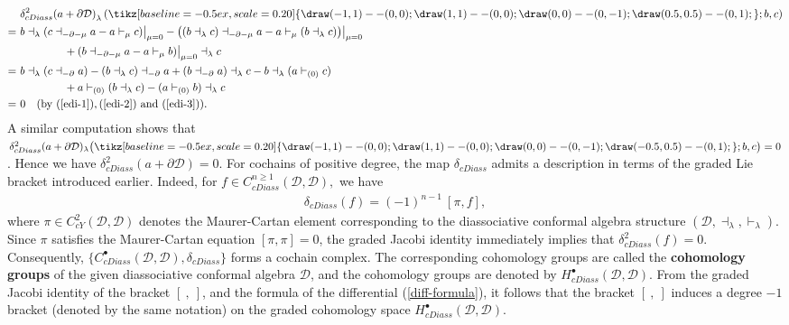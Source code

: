 \documentclass[a4paper,reqno,10pt]{amsart}
\theoremstyle{plain}
\theoremstyle{definition}
\theoremstyle{remark}
\newcommand{\D}{\mathcal{D}}
\newcommand{\p}{\partial}
\newcommand{\la}{\lambda}
\begin{document}
\begin{align*}
    &{\delta_{cDiass}^{2}(a+\p \D)}_{\la} \left( \tikz[baseline=-0.5ex,scale=0.20]{
  \draw (-1,1)--(0,0);
  \draw (1,1)--(0,0);
  \draw (0,0)--(0,-1);
  \draw (0.5,0.5)--(0,1);
}; b, c \right) \\
=~& b \dashv_{\la} (c \dashv_{-\p -\mu}a - a \vdash_{ \mu}c) \big|_{\mu = 0} - \big( ( b \dashv _{\la} c) \dashv_{ -\p -\mu} a - a \vdash_{\mu}(b \dashv_{\la} c) \big) \big|_{ \mu =0} \\ 
& \qquad \qquad + (b \dashv_{-\p -\mu} a - a \vdash _{\mu}b ) \big|_{\mu = 0} \dashv_{\la} c\\
=~& b \dashv_{\la} (c \dashv_{-\p}a)  - (b \dashv_{\la}c)\dashv_{-\p}a + (b \dashv_{-\p }a)\dashv_{\la}c - b \dashv_{\la}(a \vdash_{(0)}c) \\
& \qquad \qquad +a \vdash_{(0)}(b \dashv_{\la}c) - (a\vdash_{(0)}b)  \dashv_{\la}c\\=~&
0 \quad (\text{by } (\ref{edi-1}), (\ref{edi-2}) \text{ and } (\ref{edi-3})).
\end{align*}
A similar computation shows that $ \delta_{cDiass}^{2}(a+\p \D)_{\la} \big( \tikz[baseline=-0.5ex,scale=0.20]{
  \draw (-1,1)--(0,0);
  \draw (1,1)--(0,0);
  \draw (0,0)--(0,-1);
  \draw (-0.5,0.5)--(0,1);
}; b, c \big)   = 0$. Hence we have ${\delta_{cDiass}^{2}(a+\p \D)} = 0$. For cochains of positive degree, the map $\delta_{cDiass}$ admits a description in terms of the graded Lie bracket introduced earlier. Indeed, for $f\in C_{cDiass}^{n \geq 1 }(\D,\D),$ we have
 \begin{align}\label{diff-formula}
 \delta_{cDiass}(f) = (-1)^{n-1} ~ \! [\pi,f],
 \end{align}
where $\pi\in C_{cY}^{2}(\D,\D)$ denotes the Maurer-Cartan element corresponding to the diassociative conformal algebra structure $(\D, \dashv_\la, \vdash_\la)$. Since $\pi$ satisfies the Maurer-Cartan equation $[\pi,\pi]=0$, the graded Jacobi identity immediately implies that $\delta_{cDiass}^{2} (f)= 0$. Consequently, $\{C_{cDiass}^{\bullet}(\D,\D), \delta_{cDiass}\}$ forms a cochain complex. The corresponding cohomology groups are called the {\bf cohomology groups} of the given diassociative conformal algebra $\D$, and the cohomology groups are denoted by $H_{cDiass}^{\bullet}(\D, \D)$. From the graded Jacobi identity of the bracket $[~, ~]$, and the formula of the differential (\ref{diff-formula}), it follows that the bracket $[~, ~]$ induces a degree $-1$ bracket (denoted by the same notation) on the graded cohomology space $H_{cDiass}^{\bullet}(\D, \D)$.
\end{document}
